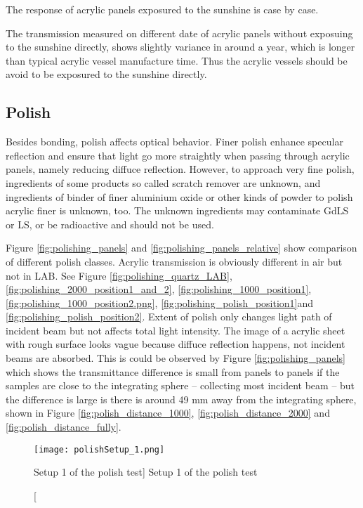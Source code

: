 

The response of acrylic panels exposured to the sunshine is case by case.


The transmission measured on different date of acrylic panels without exposuing to the sunshine directly,
shows slightly variance in around a year, which is longer than typical acrylic vessel manufacture time.
Thus the acrylic vessels should be avoid to be exposured to the sunshine directly.


\subsection {Polish}
\label{sec:Polish}

Besides bonding, polish affects optical behavior.
Finer polish enhance specular reflection and ensure that light
go more straightly when passing through acrylic panels, namely
reducing diffuce reflection. However, to approach very fine polish,
ingredients of some products so called scratch remover are unknown, and
ingredients of binder of finer aluminium oxide or other kinds of powder to polish
acrylic finer is unknown, too. The unknown ingredients may contaminate GdLS or LS, or
be radioactive and should not be used.

Figure \ref{fig:polishing_panels} and \ref{fig:polishing_panels_relative} show comparison of different polish classes.
Acrylic transmission is obviously different in air but not in LAB. See Figure \ref{fig:polishing_quartz_LAB}, \ref{fig:polishing_2000_position1_and_2},
\ref{fig:polishing_1000_position1}, \ref{fig:polishing_1000_position2.png}, \ref{fig:polishing_polish_position1}and \ref{fig:polishing_polish_position2}.
Extent of polish only changes light path of incident beam but not affects total light intensity.
The image of a acrylic sheet with rough surface looks vague because diffuce reflection happens, not
incident beams are absorbed. This is could be observed by Figure \ref{fig:polishing_panels} which shows the transmittance difference
is small from panels to panels if the samples are close to the integrating sphere -- collecting most incident beam -- but the difference is large
is there is around 49 mm away from the integrating sphere,
shown in Figure \ref{fig:polish_distance_1000}, \ref{fig:polish_distance_2000} and \ref{fig:polish_distance_fully}.

\begin{figure}
    \label{fig:polishSetup_1}
    \centering
    \texttt{[image: polishSetup\_1.png]}
    \caption
    [Setup 1 of the polish test]
    {Setup 1 of the polish test}
    \end{figure}


